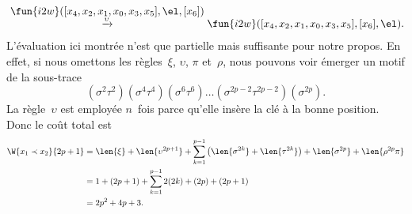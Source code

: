 \begin{itemize}
\begin{equation*}
\begin{array}{@{}r@{\;}c@{\;}l@{}}
        & \fun{i2w}([x_4,x_2,x_1,x_0,x_3,x_5],\el,[x_6])\\
        & \xrightarrow{\smash{\upsilon}}
        & \fun{i2w}([x_4,x_2,x_1,x_0,x_3,x_5],[x_6],\el).
      \end{array}
    \end{equation*}
    L'évaluation ici montrée n'est que partielle mais suffisante pour
    notre propos. En effet, si nous omettons les règles~\(\xi\),
    \(\upsilon\), \(\pi\) et~\(\rho\), nous pouvons voir émerger un
    motif de la sous-trace
    \begin{equation*}
    (\sigma^2\tau^2)(\sigma^4\tau^4)(\sigma^6\tau^6) \ldots
    (\sigma^{2p-2}\tau^{2p-2})(\sigma^{2p}).
    \end{equation*}
    La règle~\(\upsilon\) est employée \(n\)~fois parce qu'elle insère
    la clé à la bonne position. Donc le coût total est
    \begin{align*}
      \W{x_1 \prec x_2}{2p+1}
        &= \len{\xi} + \len{\upsilon^{2p+1}}
           + \sum_{k=1}^{p-1}{\left(\len{\sigma^{2k}} + \len{\tau^{2k}}\right)}
           + \len{\sigma^{2p}} + \len{\rho^{2p}\pi}\\
        &= 1 + (2p + 1) + \sum_{k=1}^{p-1}{2(2k)} + (2p) + (2p + 1)\\
        &= 2p^2 + 4p + 3.
    \end{align*}


\end{itemize}
